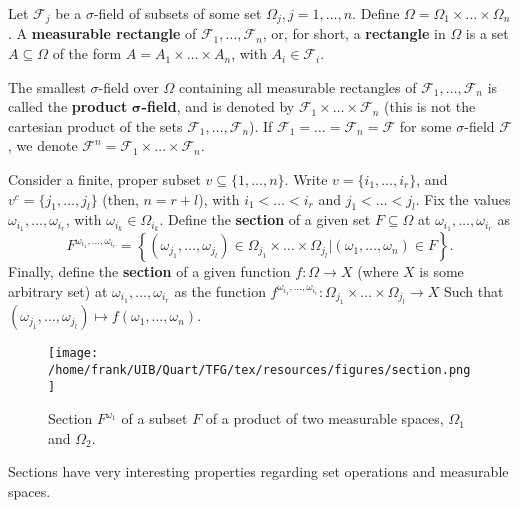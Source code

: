 \begin{defn}
  Let \(\mathcal{F}_{j}\) be a \(\sigma\)-field of subsets of some set \(\Omega_{j}, j=1,\dotsc,n\). Define \(\Omega=\Omega_{1}\times\dotsc\times\Omega_{n}\). A \textbf{measurable rectangle} of \(\mathcal{F}_{1},\dotsc,\mathcal{F}_{n}\), or, for short, a \textbf{rectangle} in \(\Omega\) is a set \(A\subseteq\Omega\) of the form \(A=A_{1}\times\dotsc\times A_{n}\), with \(A_{i}\in\mathcal{F}_{i}\).

  The smallest \(\sigma\)-field over \(\Omega\) containing all measurable rectangles of \(\mathcal{F}_{1},\dotsc,\mathcal{F}_{n}\) is called the \textbf{product} \(\pmb{\sigma}\)\textbf{-field}, and is denoted by \(\mathcal{F}_{1}\times\dotsc\times\mathcal{F}_{n}\) (this is not the cartesian product of the sets \(\mathcal{F}_{1},\dots,\mathcal{F}_{n}\)). If \(\mathcal{F}_1=\dotsc=\mathcal{F}_n=\mathcal{F}\) for some \(\sigma\)-field \(\mathcal{F}\), we denote \(\mathcal{F}^n=\mathcal{F}_1\times\dots\times\mathcal{F}_n\).

  Consider a finite, proper subset \(v\subseteq \{1,\dots,n\}\). Write \(v= \{i_1,\dots,i_r\}\), and
  \(v^c=\{j_1,\dots,j_l\}\) (then, \(n=r+l\)), with \(i_1<\dots<i_r\) and \(j_1<\dots<j_l\). Fix the values
  \(\omega_{i_1},\dots,\omega_{i_r}\), with \(\omega_{i_k}\in\Omega_{i_k}\).
  Define the \textbf{section} of a given set \(F\subseteq\Omega\) at \(\omega_{i_1},\dots,\omega_{i_r}\) as
  \[F^{\omega_{i_1},\dots,\omega_{i_r}}=\left\{\left(\omega_{j_1},\dots,\omega_{j_l}\right)\in\Omega_{j_1}\times \dots\times \Omega_{j_l}\left|\left(\omega_1,\dotsc,\omega_n\right)\in F\right.\right\}.\]
  Finally, define the \textbf{section} of a given function \(f\colon \Omega\to X \) (where \(X\) is some arbitrary set) at \(\omega_{i_{1}}, \dots , \omega_{i_{r}}\) as the function \(f^{\omega_{i_{1}}, \dots , \omega_{i_{r}}}\colon\Omega_{j_{1}}\times \dots \times \Omega_{j_{l}}\to X\) Such that \((\omega_{j_{1}}, \dots , \omega_{j_{l}})\mapsto f(\omega_1,\dots,\omega_n)\).
\end{defn}

\begin{figure}[!h]
    \centering
    \texttt{[image: /home/frank/UIB/Quart/TFG/tex/resources/figures/section.png]}
    \caption{Section \(F^{\omega_1}\) of a subset \(F\) of a product of two measurable spaces, \(\Omega_1\) and \(\Omega_2\).}
    \label{figure:section}
\end{figure}

Sections have very interesting properties regarding set operations and measurable spaces.

